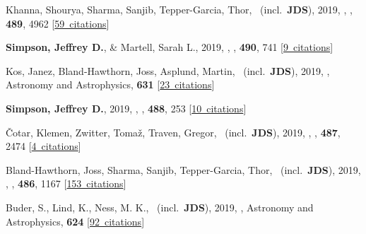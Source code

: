 \item[{\color{numcolor}\scriptsize32}] Khanna, Shourya, Sharma, Sanjib, Tepper-Garcia, Thor, \etal\ (incl.\ \textbf{JDS}), 2019, , \mnras, \textbf{489}, 4962 [\href{https://ui.adsabs.harvard.edu/#abs/2019MNRAS.489.4962K}{59~citations}]

\item[{\color{numcolor}\scriptsize31}] \textbf{Simpson, Jeffrey D.}, \& Martell, Sarah L., 2019, , \mnras, \textbf{490}, 741 [\href{https://ui.adsabs.harvard.edu/#abs/2019MNRAS.490..741S}{9~citations}]

\item[{\color{numcolor}\scriptsize30}] Kos, Janez, Bland-Hawthorn, Joss, Asplund, Martin, \etal\ (incl.\ \textbf{JDS}), 2019, , Astronomy and Astrophysics, \textbf{631} [\href{https://ui.adsabs.harvard.edu/#abs/2019A&A...631A.166K}{23~citations}]

\item[{\color{numcolor}\scriptsize29}] \textbf{Simpson, Jeffrey D.}, 2019, , \mnras, \textbf{488}, 253 [\href{https://ui.adsabs.harvard.edu/#abs/2019MNRAS.488..253S}{10~citations}]

\item[{\color{numcolor}\scriptsize28}] {\v{C}}otar, Klemen, Zwitter, Toma{\v{z}}, Traven, Gregor, \etal\ (incl.\ \textbf{JDS}), 2019, , \mnras, \textbf{487}, 2474 [\href{https://ui.adsabs.harvard.edu/#abs/2019MNRAS.487.2474C}{4~citations}]

\item[{\color{numcolor}\scriptsize27}] Bland-Hawthorn, Joss, Sharma, Sanjib, Tepper-Garcia, Thor, \etal\ (incl.\ \textbf{JDS}), 2019, , \mnras, \textbf{486}, 1167 [\href{https://ui.adsabs.harvard.edu/#abs/2019MNRAS.486.1167B}{153~citations}]

\item[{\color{numcolor}\scriptsize26}] Buder, S., Lind, K., Ness, M. K., \etal\ (incl.\ \textbf{JDS}), 2019, , Astronomy and Astrophysics, \textbf{624} [\href{https://ui.adsabs.harvard.edu/#abs/2019A&A...624A..19B}{92~citations}]

